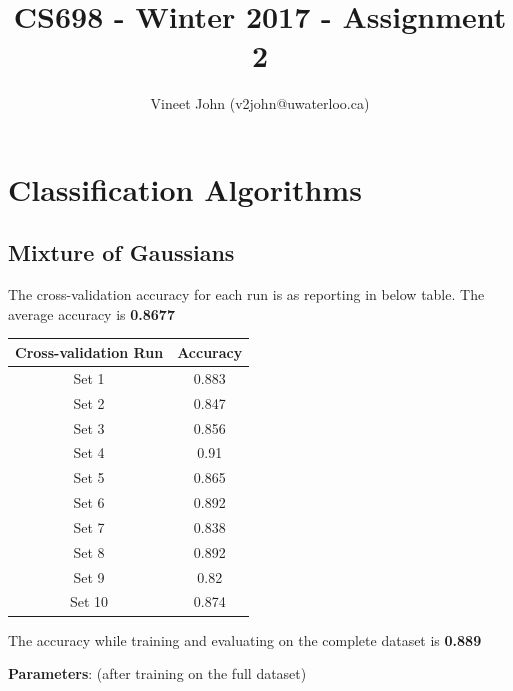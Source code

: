 \documentclass[a4paper]{article}
\title{CS698 - Winter 2017 - Assignment 2}
\author{Vineet John (v2john@uwaterloo.ca)}
\date{}
\begin{document}
\maketitle

\renewcommand\thesubsection{\alph{subsection}}

\section{Classification Algorithms}

\subsection{Mixture of Gaussians}
The cross-validation accuracy for each run is as reporting in below table. The average accuracy is \textbf{0.8677}

\begin{center} 
	\begin{tabular}{ |c|c| } 
		\hline
		\textbf{Cross-validation Run} & \textbf{Accuracy} \\
		\hline
		\hline
		Set 1  & 0.883 \\
		\hline
		Set 2  & 0.847 \\
		\hline
		Set 3  & 0.856 \\
		\hline
		Set 4  & 0.91 \\
		\hline
		Set 5  & 0.865 \\
		\hline
		Set 6  & 0.892 \\
		\hline
		Set 7  & 0.838 \\
		\hline
		Set 8  & 0.892 \\
		\hline
		Set 9  & 0.82 \\
		\hline
		Set 10 & 0.874 \\
		\hline
	\end{tabular}
\end{center}

The accuracy while training and evaluating on the complete dataset is \textbf{0.889}

\vspace{3mm}

\textbf{Parameters}: (after training on the full dataset)

\vspace{3mm}
\end{document}

